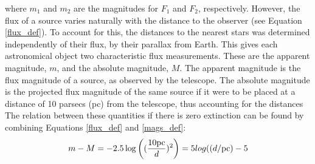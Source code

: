 \documentclass[a4paper, 11pt, oneside]{LJMU_Astro_Thesis}  %
\begin{document}
where $m_{1}$ and $m_{2}$ are the magnitudes for $F_{1}$ and $F_{2}$, respectively. However, the flux of a source varies naturally with the distance to the observer (see Equation \ref{flux_def}). To account for this, the distances to the nearest stars was determined independently of their flux, by their parallax from Earth. This gives each astronomical object two characteristic flux measurements. These are the apparent magnitude, $m$, and the absolute magnitude, $M$. The apparent magnitude is the flux magnitude of a source, as observed by the telescope. The absolute magnitude is the projected flux magnitude of the same source if it were to be placed at a distance of 10 parsecs (pc) from the telescope, thus accounting for the distances The relation between these quantities if there is zero extinction can be found by combining Equations \ref{flux_def} and \ref{mags_def}:
\begin{equation}
\label{distance_modulus}
m - M = -2.5\log \left( (\frac{10\textnormal{pc}}{d})^{2} \right) = 5log( (d/\textnormal{pc}) - 5
\end{equation}
\end{document}
